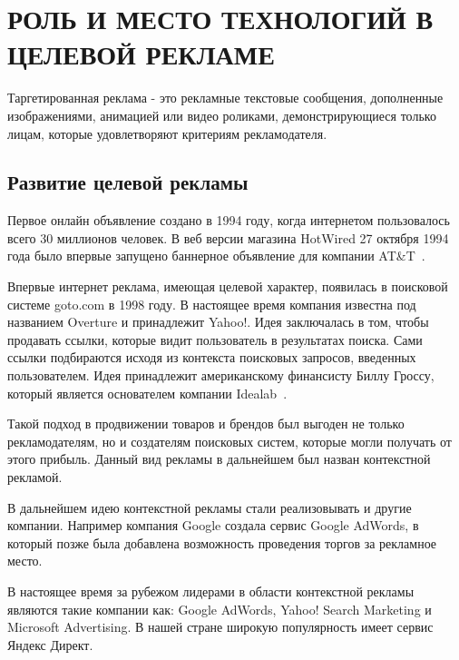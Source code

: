\chapter{РОЛЬ И МЕСТО ТЕХНОЛОГИЙ В ЦЕЛЕВОЙ РЕКЛАМЕ}

Таргетированная реклама - это рекламные текстовые сообщения, дополненные изображениями, анимацией или видео роликами, демонстрирующиеся только лицам, которые удовлетворяют критериям рекламодателя.

\section{Развитие целевой рекламы}

Первое онлайн объявление создано в 1994 году, когда интернетом пользовалось всего 30 миллионов человек. В веб версии магазина HotWired 27 октября 1994 года было впервые запущено баннерное объявление для компании  AT\&T~\cite{kumar2016evolution}.

Впервые интернет реклама, имеющая целевой характер, появилась в поисковой системе goto.com в 1998 году. В настоящее время компания известна под названием Overture и принадлежит Yahoo!. Идея заключалась в том, чтобы продавать ссылки, которые видит пользователь в результатах поиска. Сами ссылки подбираются исходя из контекста поисковых запросов, введенных пользователем. Идея принадлежит американскому финансисту Биллу Гроссу, который является основателем компании Idealab~\cite{wang2016display}.

Такой подход в продвижении товаров и брендов был выгоден не только рекламодателям, но и создателям поисковых систем, которые могли получать от этого прибыль. Данный вид рекламы в дальнейшем был назван контекстной рекламой.

В дальнейшем идею контекстной рекламы стали реализовывать и другие компании. Например компания Google создала сервис Google AdWords, в который позже была добавлена возможность проведения торгов за рекламное место.

В настоящее время за рубежом лидерами в области контекстной рекламы являются такие компании как: Google AdWords, Yahoo! Search Marketing и Microsoft Advertising. В нашей стране широкую популярность имеет сервис Яндекс Директ.

